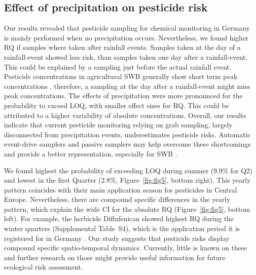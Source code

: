 \documentclass[journal=esthag,manuscript=article]{achemso}
\begin{document}
\subsection{Effect of precipitation on pesticide risk}
Our results revealed that pesticide sampling for chemical monitoring in Germany is mainly performed when no precipitation occurs. 
Nevertheless, we found higher RQ if samples where taken after rainfall events. 
Samples taken at the day of a rainfall-event showed less risk, than samples taken one day after a rainfall-event.
This could be explained by a sampling just before the actual rainfall event.
Pesticide concentrations in agricultural SWB generally show short term peak concentrations \citep{wittmer_significance_2010}, therefore, a sampling at the day after a rainfall-event might miss peak concentrations.
The effects of precipitation were more pronounced for the probability to exceed LOQ, with smaller effect sizes for RQ.
This could be attributed to a higher variability of absolute concentrations.
Overall, our results indicate that current pesticide monitoring relying on grab sampling, largely disconnected from precipitation events, underestimates pesticide risks.
Automatic event-drive samplers \citep{stehle_probabilistic_2013} and passive samplers \citep{fernandez_calibration_2014,moschet_evaluation_2015} may help overcome these shortcomings and provide a better representation, especially for SWB \citep{lorenz_specifics_2016}. 

We found highest the probability of exceeding LOQ during summer (9.9\% for Q2) and lowest in the first Quarter (2.8\%, Figure~\ref{fig:fig5}, bottom right).
This yearly pattern coincides with their main application season for pesticides in Central Europe.
Nevertheless, there are compound specific differences in the yearly pattern, which explain the wide CI for the absolute RQ (Figure~\ref{fig:fig5}, bottom left).
For example, the herbicide Diflufenican showed highest RQ during the winter quarters (Supplemental Table~S4), which is the application period it is registered for in Germany \citep{bvl_online_2016}.
Our study suggests that pesticide risks display compound specific spatio-temporal dynamics.
Currently, little is known on these and further research on those might provide useful information for future ecological risk assessment. 
\end{document}
